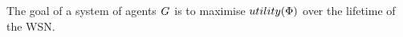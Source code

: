 	
	The goal of a system of agents $G_{}^{}$ is to maximise $\functionSystemUtility{}{}$ over the lifetime of the WSN.
	
